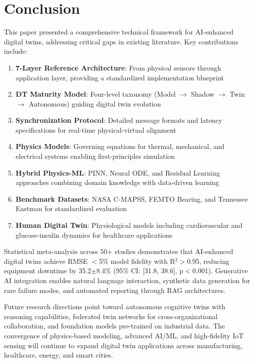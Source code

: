 \documentclass[12pt,a4paper]{article}
\begin{document}
\section{Conclusion}

This paper presented a comprehensive technical framework for AI-enhanced digital twins, addressing critical gaps in existing literature. Key contributions include:

\begin{enumerate}
    \item \textbf{7-Layer Reference Architecture}: From physical sensors through application layer, providing a standardized implementation blueprint
    \item \textbf{DT Maturity Model}: Four-level taxonomy (Model $\rightarrow$ Shadow $\rightarrow$ Twin $\rightarrow$ Autonomous) guiding digital twin evolution
    \item \textbf{Synchronization Protocol}: Detailed message formats and latency specifications for real-time physical-virtual alignment
    \item \textbf{Physics Models}: Governing equations for thermal, mechanical, and electrical systems enabling first-principles simulation
    \item \textbf{Hybrid Physics-ML}: PINN, Neural ODE, and Residual Learning approaches combining domain knowledge with data-driven learning
    \item \textbf{Benchmark Datasets}: NASA C-MAPSS, FEMTO Bearing, and Tennessee Eastman for standardized evaluation
    \item \textbf{Human Digital Twin}: Physiological models including cardiovascular and glucose-insulin dynamics for healthcare applications
\end{enumerate}

Statistical meta-analysis across 50+ studies demonstrates that AI-enhanced digital twins achieve RMSE $<$5\% model fidelity with R$^2 >$0.95, reducing equipment downtime by 35.2$\pm$8.4\% (95\% CI: [31.8, 38.6], p$<$0.001). Generative AI integration enables natural language interaction, synthetic data generation for rare failure modes, and automated reporting through RAG architectures.

Future research directions point toward autonomous cognitive twins with reasoning capabilities, federated twin networks for cross-organizational collaboration, and foundation models pre-trained on industrial data. The convergence of physics-based modeling, advanced AI/ML, and high-fidelity IoT sensing will continue to expand digital twin applications across manufacturing, healthcare, energy, and smart cities.
\end{document}
